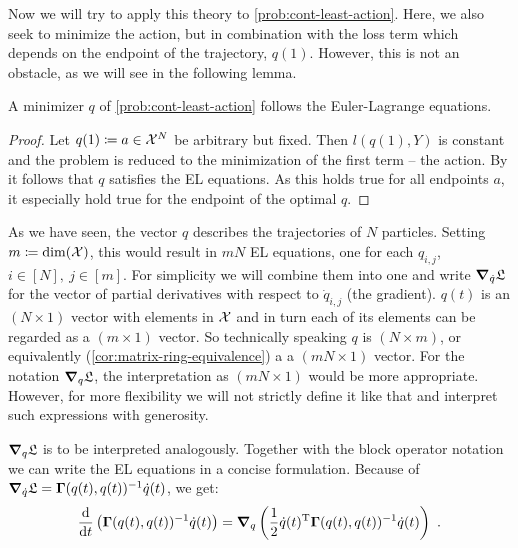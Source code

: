 Now we will try to apply this theory to \cref{prob:cont-least-action}.
Here, we also seek to minimize the action, but in combination with the loss term which depends on the endpoint of the trajectory, $q(1)$.
However, this is not an obstacle, as we will see in the following lemma.
\begin{lemma}
	A minimizer $q$ of \cref{prob:cont-least-action} follows the Euler-Lagrange equations.
\end{lemma}
\begin{proof}
	Let $q(1) \coloneqq a \in \mathcal{X}^N$ be arbitrary but fixed.
	Then $l(q(1), Y)$ is constant and the problem is reduced to the minimization of the first term -- the action.
	By \cite[~Proposition 1.4.1]{kielhofer18} it follows that $q$ satisfies the EL equations.
	As this holds true for all endpoints $a$, it especially hold true for the endpoint of the optimal $q$.
\end{proof}

As we have seen, the vector $q$ describes the trajectories of $N$ particles.
Setting $m \coloneqq \mathrm{dim}(\mathcal{X})$, this would result in $mN$ EL equations, one for each $q_{i, j}$, $i \in [N],\ j \in [m]$.
For simplicity we will combine them into one and write $\grad_{\dot{q}} \mathfrak{L}$ for the vector of partial derivatives with respect to $\dot{q}_{i, j}$ (the gradient).
$q(t)$ is an $(N\times1)$ vector with elements in $\mathcal{X}$ and in turn each of its elements can be regarded as a $(m\times1)$ vector.
So technically speaking $q$ is $(N \times m)$, or equivalently (\cref{cor:matrix-ring-equivalence}) a a $(mN \times 1)$ vector.
For the notation $\grad_q \mathfrak{L}$, the interpretation as $(mN \times 1)$ would be more appropriate.
However, for more flexibility we will not strictly define it like that and interpret such expressions with generosity.

$\grad_q \mathfrak{L}$ is to be interpreted analogously.
Together with the block operator notation we can write the EL equations in a concise formulation.
Because of $\grad_{\dot{q}} \mathfrak{L} = \mathbf{\Gamma}(q(t), q(t))^{-1} \dot{q}(t)$, we get:
\begin{equation}
\label{eq:concrete-lagrangian}
	\frac{\mathrm{d}}{\mathrm{d}t} \left(\mathbf{\Gamma}(q(t), q(t))^{-1} \dot{q}(t) \right)
	= \grad_q \left(\frac{1}{2} \dot{q}(t)^\mathrm{T} \mathbf{\Gamma}(q(t), q(t))^{-1} \dot{q}(t)\right) \ .
\end{equation}
